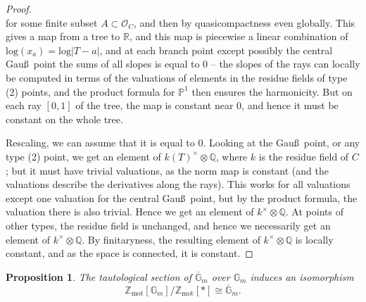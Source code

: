 \documentclass[11pt]{amsart}
\numberwithin{equation}{section}
\numberwithin{theorem}{section}
\newtheorem{proposition}[theorem]{Proposition}
\theoremstyle{definition}
\begin{document}
\begin{proof}
\[\]
for some finite subset $A\subset \mathcal O_C$, and then by quasicompactness even globally. This gives a map from a tree to $\mathbb R$, and this map is piecewise a linear combination of $\mathrm{log}(x_a)=\mathrm{log} |T-a|$, and at each branch point except possibly the central Gau\ss\ point the sums of all slopes is equal to $0$ -- the slopes of the rays can locally be computed in terms of the valuations of elements in the residue fields of type (2) points, and the product formula for $\mathbb P^1$ then ensures the harmonicity. But on each ray $[0,1]$ of the tree, the map is constant near $0$, and hence it must be constant on the whole tree.

Rescaling, we can assume that it is equal to $0$. Looking at the Gau\ss\ point, or any type (2) point, we get an element of $k(T)^\times\otimes \mathbb Q$, where $k$ is the residue field of $C$; but it must have trivial valuations, as the norm map is constant (and the valuations describe the derivatives along the rays). This works for all valuations except one valuation for the central Gau\ss\ point, but by the product formula, the valuation there is also trivial. Hence we get an element of $k^\times\otimes \mathbb Q$. At points of other types, the residue field is unchanged, and hence we necessarily get an element of $k^\times\otimes \mathbb Q$. By finitaryness, the resulting element of $k^\times\otimes \mathbb Q$ is locally constant, and as the space is connected, it is constant.
\end{proof}

\begin{proposition} The tautological section of $\overline{\mathbb G}_m$ over $\mathbb G_m$ induces an isomorphism
\[
\mathbb Z_{\mathrm{mot}}[\mathbb G_m]/\mathbb Z_{\mathrm{mot}}[\ast]\cong \overline{\mathbb G}_m.
\]
\end{proposition}
\end{document}
